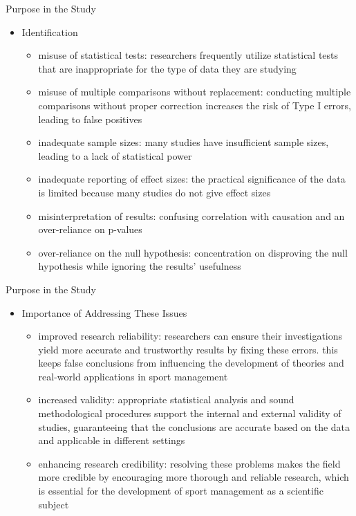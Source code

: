\documentclass[aspectratio=169, 12pt]{beamer}
\begin{document}
\begin{frame}{Purpose in the Study}
  \begin{itemize}
      \item Identification
      \begin{itemize}
          \item misuse of statistical tests: researchers frequently utilize statistical tests that are inappropriate for the type of data they are studying
          \item misuse of multiple comparisons without replacement: conducting multiple comparisons without proper correction increases the risk of Type I errors, leading to false positives
          \item inadequate sample sizes: many studies have insufficient sample sizes, leading to a lack of statistical power
          \item inadequate reporting of effect sizes: the practical significance of the data is limited because many studies do not give effect sizes
          \item misinterpretation of results: confusing correlation with causation and an over-reliance on p-values
          \item over-reliance on the null hypothesis: concentration on disproving the null hypothesis while ignoring the results' usefulness
      \end{itemize}
  \end{itemize}
\end{frame}


\begin{frame}{Purpose in the Study}
  \begin{itemize}
      \item Importance of Addressing These Issues
      \begin{itemize}
          \item improved research reliability: researchers can ensure their investigations yield more accurate and trustworthy results by fixing these errors. this keeps false conclusions from influencing the development of theories and real-world applications in sport management
          \item increased validity: appropriate statistical analysis and sound methodological procedures support the internal and external validity of studies, guaranteeing that the conclusions are accurate based on the data and applicable in different settings
          \item enhancing research credibility: resolving these problems makes the field more credible by encouraging more thorough and reliable research, which is essential for the development of sport management as a scientific subject
      \end{itemize}
  \end{itemize}
\end{frame}
\end{document}
